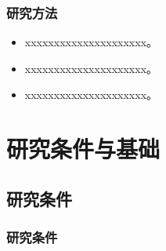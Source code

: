 \documentclass{beamer}
\theoremstyle{remark}
\begin{document}
\begin{frame}
	\frametitle{研究方法}
	\begin{itemize}
		\item xxxxxxxxxxxxxxxxxxxxx。
		\item xxxxxxxxxxxxxxxxxxxxx。
		\item xxxxxxxxxxxxxxxxxxxxx。
	\end{itemize}
\end{frame}


	
	



\section{研究条件与基础}
\subsection{研究条件}
\begin{frame}
	\frametitle{研究条件}
\end{frame}
\end{document}
